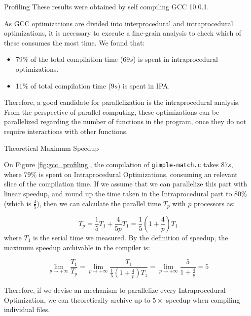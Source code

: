 \begin{section}{Profiling}
These results were obtained by self compiling GCC 10.0.1.

As GCC optimizations are divided into interprocedural and intraprocedural
optimizations, it is necessary to execute a fine-grain analysis to check which
of these consumes the most time. We found that:
\begin{itemize}
	\item 79\% of the total compilation time ($69s$) is spent in intraprocedural
	optimizations.

	\item 11\% of total compilation time ($9s$) is spent in IPA.
\end{itemize}

Therefore, a good candidate for parallelization is the intraprocedural
analysis. From the perspective of parallel computing, these optimizations can
be parallelized regarding the number of functions in the program, once they do
not require interactions with other functions.

\begin{subsection}{Theoretical Maximum Speedup}\label{sec:speedup}

On Figure \ref{fig:gcc_profiling}, the compilation of \texttt{gimple-match.c}
takes $87s$, where $79\%$ is spent on Intraprocedural Optimizations, consuming
an relevant slice of the compilation time. If we assume that we can parallelize
this part with linear speedup, and round up the time taken in the
Intraprocedural part to $80\%$ (which is $\frac{4}{5}$), then we can calculate
the parallel time $T_p$ with $p$ processors as:

$$ T_p = \frac{1}{5} T_1 + \frac{4}{5p}T_1 = \frac{1}{5} \left( 1 + \frac{4}{p}
\right)T_1 $$
where $T_1$ is the serial time we measured. By the definition of speedup,
the maximum speedup archivable in the compiler is:

$$\lim_{p \rightarrow +\infty} \frac{T_1}{T_p} = \lim_{p \rightarrow +\infty}
\frac{T_1}{\frac{1}{5} \left( 1 + \frac{4}{p} \right)T_1} = \lim_{p \rightarrow
+\infty} \frac{5}{1 + \frac{4}{p}} = 5$$

Therefore, if we devise an mechanism to parallelize every Intraprocedural
Optimization, we can theoretically archive up to $5\times$ speedup when compiling individual
files.

\end{subsection}

\end{section}

